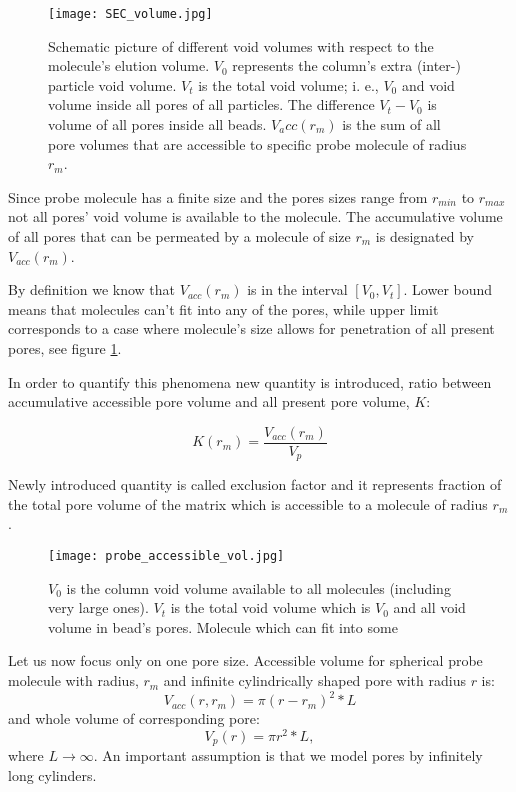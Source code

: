 \begin{figure}[h]
    \centering
    \texttt{[image: SEC\_volume.jpg]}
    \caption{Schematic picture of different void volumes with respect to the
        molecule's elution volume. $V_0$ represents the column's extra (inter-)
        particle void volume. $V_t$ is the total void volume; i. e., $V_0$ and void
        volume inside all pores of all particles. The difference $V_t - V_0$ is
        volume of all pores inside all beads. $V_acc(r_m)$ is the sum of all pore
        volumes that are accessible to specific probe molecule of radius $r_m$.}
    \label{fig:volScale}
\end{figure}

Since probe molecule has a finite size and the pores sizes range from $r_{min}$
to $r_{max}$ not all pores' void volume is available to the molecule. The
accumulative volume of all pores that can be permeated by a molecule of size
$r_m$ is designated by $V_{acc}(r_m)$.

By definition we know that $V_{acc}(r_m)$ is in the interval $[V_0, V_t]$.
Lower bound means that molecules can't fit into any of the pores, while upper
limit corresponds to a case where molecule's size allows for penetration of all
present pores, see figure \ref{fig:volScale}.

In order to quantify this phenomena new quantity is introduced, ratio between
accumulative accessible pore volume and all present pore volume, $K$:

\begin{equation}\label{eq:exclusion_factor}
    K(r_m) = \frac{V_{acc}(r_m)}{V_p}
\end{equation}

Newly introduced quantity is called exclusion factor and it represents fraction
of the total pore volume of the matrix which is accessible to a molecule of
radius $r_m$.

\begin{figure}[h]
    \centering
    \texttt{[image: probe\_accessible\_vol.jpg]}
    \caption{$V_0$ is the column void volume available to all molecules
        (including very large ones). $V_t$ is the total void volume which is $V_0$
        and all void volume in bead's pores. Molecule which can fit into some}
    \label{fig1}
\end{figure}

Let us now focus only on one pore size. Accessible volume for spherical probe
molecule with radius, $r_m$ and infinite cylindrically shaped pore with radius
$r$ is:
\begin{equation} \label{eq:acc_vol}
    V_{acc}(r, r_m) = \pi (r - r_m )^2 * L
\end{equation}
and whole volume of corresponding pore:
\begin{equation}
    V_{p}(r) = \pi r^2 * L,
\end{equation}
where $L\rightarrow\infty$. An important assumption is that we model pores by
infinitely long cylinders.


